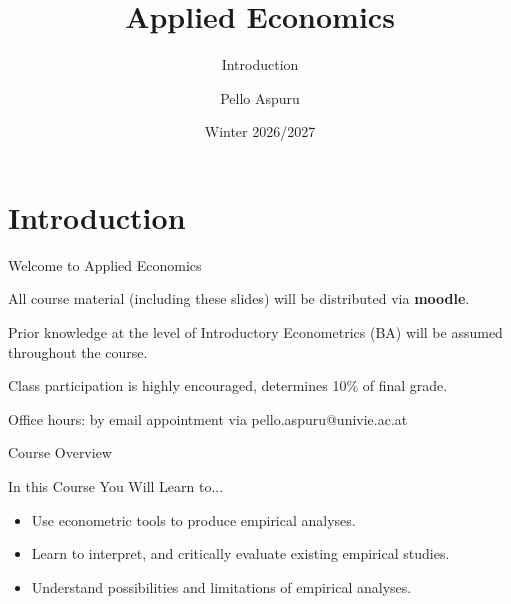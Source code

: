 \documentclass[9pt,aspectratio=169]{beamer}
\title{Applied Economics}
\subtitle{Introduction}
\author{Pello Aspuru}
\date{Winter 2026/2027}
\begin{document}
{
  \begin{frame}
    \titlepage
  \end{frame}
}


\section[Course Logistics]{Introduction}

\begin{frame}[fragile]{Welcome to Applied Economics}



All course material (including these slides) will be distributed via \textbf{moodle}.

\alert{Prior knowledge at the level of Introductory Econometrics (BA) will be assumed throughout the course.}


Class participation is highly encouraged, determines 10\% of final grade.

Office hours: by email appointment via pello.aspuru@univie.ac.at

\end{frame}

\begin{frame}{Course Overview}
 \begin{block}{In this Course You Will Learn to...}
\begin{itemize} 
\item Use econometric tools to produce empirical analyses.
\item Learn to interpret, and critically evaluate existing empirical studies.
\item Understand possibilities and limitations of empirical analyses.
\end{itemize}
\end{block}
\end{frame}
\end{document}
